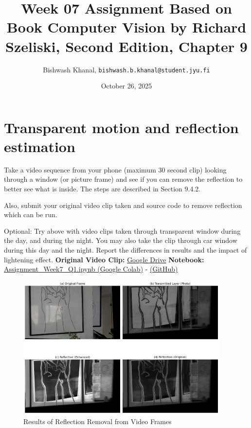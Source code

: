 \documentclass[12pt,a4paper]{article}
\title{Week 07 Assignment Based on Book Computer Vision by Richard Szeliski, Second Edition, Chapter 9}
\author{Bishwash Khanal, \texttt{bishwash.b.khanal@student.jyu.fi}}
\date{October 26, 2025}
\begin{document}
\maketitle

\section{Transparent motion and reflection estimation}
Take a video sequence from your phone (maximum 30 second clip) looking through a window (or picture frame) and see if you can remove the 
reflection to better see what is inside. The steps are described in Section 9.4.2.

Also, submit your original video clip taken and source code to remove reflection which can be run.

Optional: Try above with video clips taken through transparent window during the day, and during the night. You may also take the clip 
through car window during this day and the night. Report the differences in results and the impact of lightening effect.
\newline
\textbf{Original Video Clip:} \href{https://drive.google.com/file/d/1gjEgFKrlBo2PgFSqi23-u5K3uIAr0AF5/view?usp=sharing}{Google Drive}
\newline
\textbf{Notebook:} \href{https://colab.research.google.com/drive/1H8oc060oYT3zyzLS-TISJCzxbsjmcvuA?usp=sharing}{Assignment\_Week7\_Q1.ipynb (Google Colab)} - 
\href{https://github.com/bkhanal-11/ties411_cvip_jyu/blob/master/assignment7/src/Assignment_Week7_Q1.ipynb}{(GitHub)}

\begin{figure}[htb]
    \centering
    \includegraphics[width=0.95\textwidth]{src/reflection_removal_results.png}
    \caption{Results of Reflection Removal from Video Frames}
    \label{fig:comparison}
\end{figure}
\end{document}
